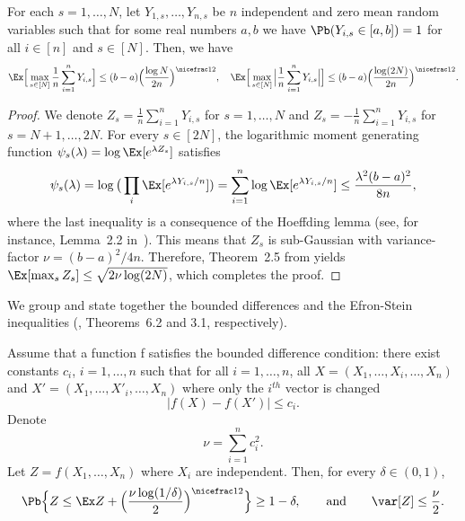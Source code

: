 \begin{theorem}\label{Hoeffding1}
For each $s=1,\ldots,N$, let $Y_{1,s},\ldots,Y_{n,s}$ be $n$ independent and zero mean random variables such that
for some real numbers $a,b$ we have $\Pb(Y_{i,s}\in[a,b])=1$ for all $i\in[n]$
and $s\in[N]$. Then, we have
\begin{equation}
  \Ex\Big[\max_{s\in[N]} \frac1n\sum_{i=1}^n Y_{i,s}\Big]\le (b-a)\Big(\frac{\log N}{2n}\Big)^{\nicefrac12},\quad
  \Ex\Big[\max_{s\in[N]}\Big| \frac1n\sum_{i=1}^n Y_{i,s}\Big|\Big]\le (b-a)\Big(\frac{\log(2N)}{2n}\Big)^{\nicefrac12}.
\end{equation}
\end{theorem}
\begin{proof}
We denote $Z_s = \frac1n\sum_{i=1}^n Y_{i,s}$ for $s=1,\ldots, N$ and $Z_s = -\frac1n\sum_{i=1}^n Y_{i,s}$
for $s=N+1,\ldots,2N$. For every $s\in[2N]$, the logarithmic moment generating function $\psi_s(\lambda) =
\log \Ex[e^{\lambda Z_{s}}]$ satisfies
\begin{equation}
\psi_s(\lambda) =  \log \big(\prod_i \Ex[e^{\lambda Y_{i,s}/n}])
    = \sum_{i=1}^n \log  \Ex[e^{\lambda Y_{i,s}/n}] \le \frac{\lambda^2(b-a)^2}{8n},
\end{equation}
where the last inequality is a consequence of the Hoeffding lemma (see, for instance,  Lemma~2.2
in~\citep{boucheron2013concentration}). This means that $Z_s$ is sub-Gaussian with variance-factor
$\nu = {(b-a)^2}/{4n}$. Therefore, Theorem~2.5 from \citep{boucheron2013concentration}
yields $\Ex[\max_s Z_s]\le \sqrt{2\nu\log(2N)}$, which completes the proof.
\end{proof}

We group and state together the bounded differences and the Efron-Stein inequalities (\cite{boucheron2013concentration},
Theorems~6.2 and 3.1, respectively).

\begin{theorem}\label{McDiarmid}
Assume that a function f satisfies the bounded difference condition: there exist constants $c_i$, $i=1,\ldots,n$
such that for all $i=1,\ldots, n$, all $X=(X_1,\dots,X_i,\dots,X_n)$ and $X'=(X_1,\dots,X'_i,\dots,X_n)$ where
only the $i^{th}$ vector is changed
\begin{equation}
  |f(X)-f(X')| \leq c_i.
\end{equation}
Denote
\begin{equation}
  \nu = \sum_{i=1}^n c_i^2.
\end{equation}
Let $Z=f(X_1,\dots,X_n)$ where $X_i$ are independent. Then, for every $\delta\in(0,1)$,
\begin{equation}
  \Pb\Big\{Z\le \Ex Z +\Big(\frac{\nu\log(1/\delta)}{2}\Big)^{\nicefrac12} \Big\} \geq 1-\delta,\qquad\text{and}\qquad \var[Z] \le \frac{\nu}{2}.
\end{equation}
\end{theorem}

